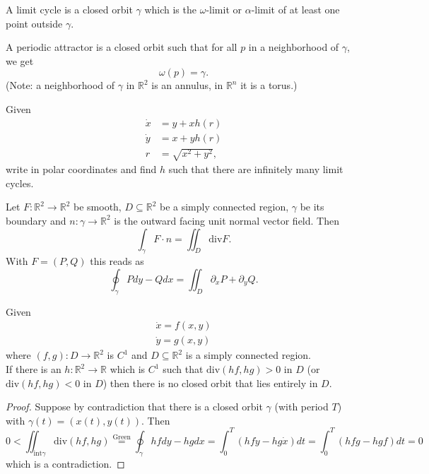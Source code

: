 \documentclass{article}
\newcommand*{\R}{\mathbb{R}}
\newcommand*{\divg}{\text{div}}
\begin{document}
\begin{defin}
    A limit cycle is a closed orbit $\gamma$ which is the $\omega$-limit or $\alpha$-limit of at least one point outside $\gamma$.
\end{defin}

\begin{defin}
    A periodic attractor is a closed orbit such that for all $p$ in a neighborhood of $\gamma$, we get
    $$\omega(p)=\gamma.$$
    (Note: a neighborhood of $\gamma$ in $\R^2$ is an annulus, in $\R^n$ it is a torus.)
\end{defin}

\begin{hw}
    Given
    $$\begin{aligned}
        \dot x &= y+xh(r)\\
        \dot y &= x+yh(r)\\
        r &= \sqrt{x^2+y^2},
    \end{aligned}$$
    write in polar coordinates and find $h$ such that there are infinitely many limit cycles.
\end{hw}

\begin{thm}
    Let $F:\R^2\to\R^2$ be smooth, $D\subseteq \R^2$ be a simply connected region, $\gamma$ be its boundary and
    $n: \gamma \to\R^2$ is the outward facing unit normal vector field. Then
    $$\int_\gamma F\cdot n=\iint_D\divg F.$$
    With $F=(P,Q)$ this reads as
    $$\oint_\gamma Pdy-Qdx = \iint_D\partial_x P+\partial_y Q.$$

\end{thm}

\begin{thm}
    Given
    $$\begin{aligned}
        \dot x = f(x,y)\\
        \dot y = g(x,y)
    \end{aligned}$$
    where $(f,g):D \to\R^2$ is $C^1$ and $D \subseteq \R^2$ is a simply connected region.\\
    If there is an $h:\R^2\to\R$ which is $C^1$ such that $\text{div}(hf,hg) > 0$ in $D$ (or $\text{div}(hf,hg)<0$ in $D$) then there is no closed orbit that lies entirely in $D$.
\end{thm}

\begin{proof}
    Suppose by contradiction that there is a closed orbit $\gamma$ (with period $T$) with $\gamma(t) = (x(t),y(t))$. Then
    $$0 < \iint_{\text{int} \gamma} \text{div}(hf,hg) \stackrel{\text{Green}}{=} \oint_\gamma hfdy-hgdx = \int_0^T (hf\dot y-hg\dot x)dt  = \int_0^T (hfg-hgf)dt = 0$$
    which is a contradiction.
\end{proof}
\end{document}
